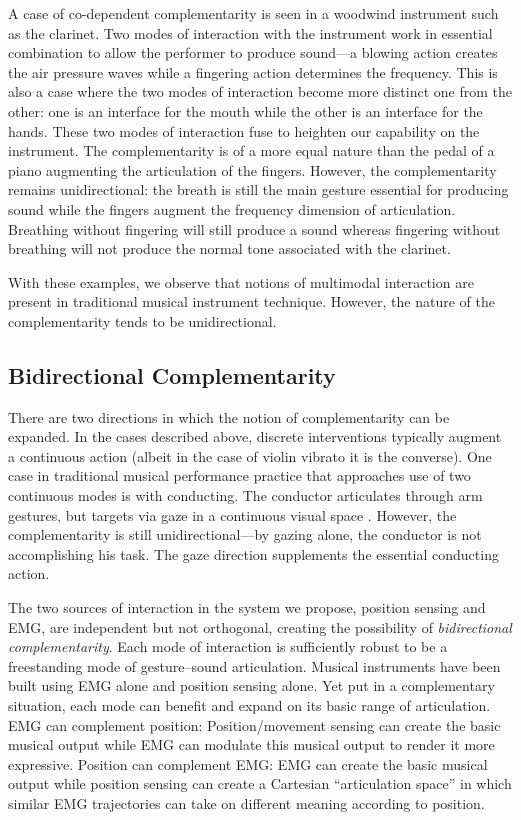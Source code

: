 A case of co-dependent complementarity is seen in a woodwind instrument such as the clarinet. Two modes of interaction with the instrument work in essential combination to allow the performer to produce sound---a blowing action creates the air pressure waves while a fingering action determines the frequency. This is also a case where the two modes of interaction become more distinct one from the other: one is an interface for the mouth while the other is an interface for the hands. These two modes of interaction fuse to heighten our capability on the instrument. The complementarity is of a more equal nature than the pedal of a piano augmenting the articulation of the fingers. However, the complementarity remains unidirectional: the breath is still the main gesture essential for producing sound while the fingers augment the frequency dimension of articulation. Breathing without fingering will still produce a sound whereas fingering without breathing will not produce the normal tone associated with the clarinet.

With these examples, we observe that notions of multimodal interaction are present in traditional musical instrument technique. However, the nature of the complementarity tends to be unidirectional.

 
\subsection{Bidirectional Complementarity}

 
 There are two directions in which the notion of complementarity can be expanded. In the cases described above, discrete interventions typically augment a continuous action (albeit in the case of violin vibrato it is the converse).  One case in traditional musical performance practice that approaches use of two continuous modes is with conducting. The conductor articulates through arm gestures, but targets via gaze in a continuous visual space \cite{Usa:1998}.  However, the complementarity is still unidirectional---by gazing alone, the conductor is not accomplishing his task. The gaze direction supplements the essential conducting action.

The two sources of interaction in the system we propose, position sensing and EMG, are independent but not orthogonal, creating the possibility of \textit{bidirectional complementarity}. Each mode of interaction is sufficiently robust to be a freestanding mode of gesture--sound articulation. Musical instruments have been built using EMG alone and position sensing alone. Yet put in a complementary situation, each mode can benefit and expand on its basic range of articulation. EMG can complement position: Position/movement sensing can create the basic musical output while EMG can modulate this musical output to render it more expressive. Position can complement EMG: EMG can create the basic musical output while position sensing can create a Cartesian ``articulation space'' in which similar EMG trajectories can take on different meaning according to position.

